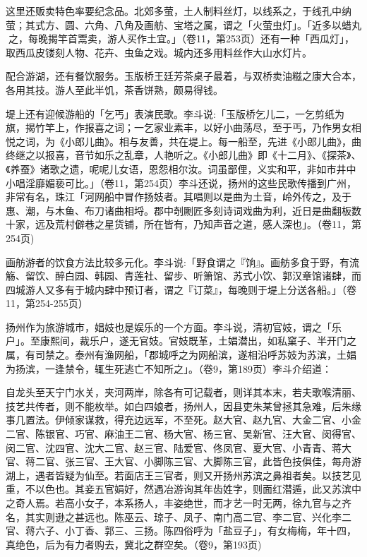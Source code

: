 这里还贩卖特色率要纪念品。北郊多萤，土人制料丝灯，以线系之，于线孔中纳萤；其式方、圆、六角、八角及画舫、宝塔之属，谓之「火萤虫灯」。「近多以蜡丸𦶟之，每晚揭竿首鬻卖，游人买作土宜。」（卷11，第253页）还有一种「西瓜灯」，取西瓜皮镂刻人物、花卉、虫鱼之戏。城内还多用料丝作大山水灯片。

配合游湖，还有餐饮服务。玉版桥王廷芳茶桌子最着，与双桥卖油糍之康大合本，各用其技。游人至此半饥，茶香饼熟，颇易得钱。

堤上还有迎候游船的「乞丐」表演民歌。李斗说:「玉版桥乞儿二，一乞剪纸为旗，揭竹竿上，作报喜之词；一乞家业素丰，以好小曲荡尽，至于丐，乃作男女相悦之词，为《小郎儿曲》。相与友善，共在堤上。每一船至，先进《小郎儿曲》，曲终继之以报喜，音节如乐之乱章，人艳听之。《小郎儿曲》即《十二月》、《探茶》、《养蚕》诸歌之遗，呢呢儿女语，恩怨相尔汝。词虽鄙俚，义实和平，非如市井中小唱淫靡媚亵可比。」（卷11，第254页）李斗还说，扬州的这些民歌传播到广州，非常有名，珠江「河网船中冒作扬妓者。其唱则以是曲为土音，岭外传之，及于惠、潮，与木鱼、布刀诸曲相埒。郡中剞劂匠多刻诗词戏曲为利，近日是曲翻板数十家，远及荒村僻巷之星货铺，所在皆有，乃知声音之道，感人深也」。（卷11，第254页)


画舫游者的饮食方法比较多元化。李斗说:「野食谓之『饷』。画舫多食于野，有流觞、留饮、醉白园、韩园、青莲社、留步、听箫馆、苏式小饮、郭汉章馆诸肆，而四城游人又多有于城内肆中预订者，谓之『订菜』，每晚则于堤上分送各船。」（卷11，第254-255页）

扬州作为旅游城市，娼妓也是娱乐的一个方面。李斗说，清初官妓，谓之「乐户」。至康熙间，裁乐户，遂无官妓。官妓既革，土娼潜出，如私窠子、半开门之属，有司禁之。泰州有渔网船，「郡城呼之为网船滨，遂相沿呼苏妓为苏滨，土娼为扬滨，一逢禁令，辄生死逃亡不知所之」。（卷9，第189页）李斗介绍道：

\begin{BookQuote}
自龙头至天宁门水关，夹河两岸，除各有可记载者，则详其本末，若夫歌喉清丽、技艺共传者，则不能枚举。如白四娘者，扬州人，因县吏朱某曾拯其急难，后朱缘事几置法。伊倾家谋救，得充边远军，不至死。赵大官、赵九官、大金二官、小金二官、陈银官、巧官、麻油王二官、杨大官、杨三官、吴新官、汪大官、闵得官、闵二官、沈四官、沈大二官、赵三官、陆爱官、佟凤官、夏大官、小青青、蒋大官、蒋二官、张三官、王大官、小脚陈三官、大脚陈三官，此皆色技俱佳，每舟游湖上，遇者皆疑为仙至。若面店王三官者，则又开扬州苏滨之鼻祖者矣。以技艺见重，不以色也。其妾五官娟好，然遇冶游询其年齿姓字，则面红潜遁，此又苏滨中之奇人焉。若高小女子，本系扬人，丰姿绝世，而才艺一时无两，徐九官与之齐名，其实则逊之甚远也。陈巫云、琼子、凤子、南门高二官、李二官、兴化李二官、蒋六子、小丁香、郭三、三扬。陈四俗呼为「盐豆子」，有女梅梅，年十四，真绝色，后为有力者购去，冀北之群空矣。（卷9，第193页)
\end{BookQuote}

